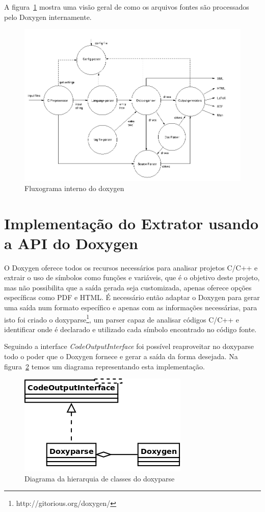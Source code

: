 A figura~\ref{fig:doxygen-internals-flow} mostra uma visão geral de como os
arquivos fontes são processados pelo Doxygen internamente.

\begin{figure}[h]
\center
\includegraphics[scale=0.5]{imagens/doxygen-internals-flow}
\caption{Fluxograma interno do doxygen\cite{doxygenInternals}}
\label{fig:doxygen-internals-flow}
\end{figure}

\section{Implementação do Extrator usando a API do Doxygen}

O Doxygen oferece todos os recursos necessários para analisar projetos C/C++ e
extrair o uso de símbolos como funções e variáveis, que é o objetivo deste
projeto, mas não possibilita que a saída gerada seja customizada, apenas
oferece opções específicas como PDF e HTML. É necessário então adaptar o
Doxygen para gerar uma saída num formato específico e apenas com as informações
necessárias, para isto foi criado o
doxyparse\footnote{http://gitorious.org/doxygen/}, um parser capaz de analisar
códigos C/C++ e identificar onde é declarado e utilizado cada símbolo
encontrado no código fonte.

Seguindo a interface {\it CodeOutputInterface} foi possível reaproveitar no
doxyparse todo o poder que o Doxygen fornece e gerar a saída da forma desejada.
Na figura~\ref{doxyparse-diagram} temos um diagrama representando esta
implementação.

\begin{figure}[h]
\center
\includegraphics[scale=0.4]{imagens/doxyparse-diagram}
\caption{Diagrama da hierarquia de classes do doxyparse}
\label{doxyparse-diagram}
\end{figure}


